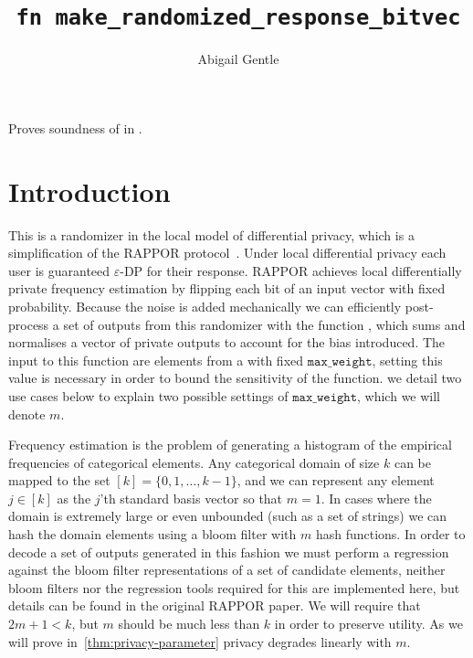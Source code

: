 \documentclass{article}
\title{\texttt{fn make\_randomized\_response\_bitvec}}
\author{Abigail Gentle}
\begin{document}
\maketitle



\contrib

Proves soundness of  in .

\section{Introduction}
This is a randomizer in the local model of differential privacy, which is a simplification of the RAPPOR protocol~\cite{rappor}. Under local differential privacy each user is guaranteed $\varepsilon$-DP for their response. RAPPOR achieves local differentially private frequency estimation by flipping each bit of an input vector with fixed probability. Because the noise is added mechanically we can efficiently post-process a set of outputs from this randomizer with the function , which sums and normalises a vector of private outputs to account for the bias introduced. The input to this function are elements from a  with fixed $\texttt{max\_weight}$, setting this value is necessary in order to bound the sensitivity of the function. we detail two use cases below to explain two possible settings of $\texttt{max\_weight}$, which we will denote $m$.

Frequency estimation is the problem of generating a histogram of the empirical frequencies of categorical elements. Any categorical domain of size $k$ can be mapped to the set $[k]=\{0,1,\ldots,k-1\}$, and we can represent any element $j\in[k]$ as the $j$'th standard basis vector so that $m=1$. In cases where the domain is extremely large or even unbounded (such as a set of strings) we can hash the domain elements using a bloom filter with $m$ hash functions. In order to decode a set of outputs generated in this fashion we must perform a regression against the bloom filter representations of a set of candidate elements, neither bloom filters nor the regression tools required for this are implemented here, but details can be found in the original RAPPOR paper. We will require that $2m+1<k$, but $m$ should be much less than $k$ in order to preserve utility. As we will prove in~\ref{thm:privacy-parameter} privacy degrades linearly with $m$. 
\end{document}
